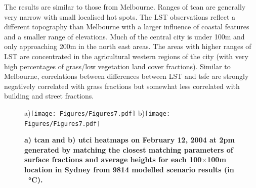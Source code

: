 \documentclass[final,3p,times,authoryear]{elsarticle}
\begin{document}
The results are similar to those from Melbourne. Ranges of \gls{tcan} are generally very narrow with small localised hot spots. The LST observations reflect a different topography than Melbourne with a larger influence of coastal features and a smaller range of elevations. Much of the central city is under 100m and only approaching 200m in the north east areas. The areas with higher ranges of LST are concentrated in the agricultural western regions of the city (with very high percentages of grass/low vegetation land cover fractions). Similar to Melbourne, correlations between differences between LST and \gls{tsfc} are strongly negatively correlated with grass fractions but somewhat less correlated with building and street fractions.




\begin{figure}
\centering
a)\texttt{[image: Figures/Figures7.pdf]}
b)\texttt{[image: Figures/Figures7.pdf]}
\caption{\bf a) \gls{tcan} and b) \gls{utci} heatmaps on February 12, 2004 at 2pm generated by matching the closest matching parameters of surface fractions and average heights for each 100$\times$100m location in Sydney from 9814 modelled scenario results (in \SI{}{\degreeCelsius}).  }
 \label{fig:TaSyd} \label{fig:utciSyd}
\end{figure}
\end{document}
